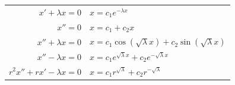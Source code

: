 \begin{table}[H]
    \centering
    \begin{tabular}{r|l}
        $x' + \lambda x = 0$             & $x = c_1e^{-\lambda x}$                                   \\
        $x'' = 0$                        & $x = c_1 + c_2x$                                          \\
        $x'' + \lambda x = 0$            & $x = c_1\cos(\sqrt{\lambda}x) + c_2\sin(\sqrt{\lambda}x)$ \\
        $x'' - \lambda x = 0$            & $x = c_1e^{\sqrt{\lambda}x} + c_2e^{-\sqrt{\lambda}x}$    \\
        $r^2 x'' + r x' - \lambda x = 0$ & $x = c_1r^{\sqrt{\lambda}} + c_2r^{-\sqrt{\lambda}}$
    \end{tabular}
\end{table}